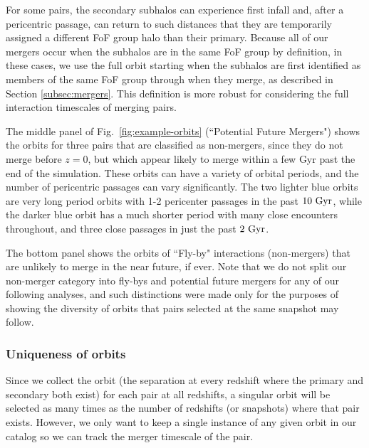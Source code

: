 \documentclass[twocolumn,linenumbers]{aastex631}
\begin{document}
For some pairs, the secondary subhalos can experience first infall and, after a pericentric passage, can return to such distances that they are temporarily assigned a different FoF group halo than their primary. 
Because all of our mergers occur when the subhalos are in the same FoF group by definition, in these cases, we use the full orbit starting when the subhalos are first identified as members of the same FoF group through when they merge, as described in Section \ref{subsec:mergers}.
This definition is more robust for considering the full interaction timescales of merging pairs.

The middle panel of Fig.~\ref{fig:example-orbits} (``Potential Future Mergers") shows the orbits for three pairs that are classified as non-mergers, since they do not merge before $z=0$, but which appear likely to merge within a few Gyr past the end of the simulation. 
These orbits can have a variety of orbital periods, and the number of pericentric passages can vary significantly. 
The two lighter blue orbits are very long period orbits with 1-2 pericenter passages in the past $10\,\mathrm{\,Gyr}$, while the darker blue orbit has a much shorter period with many close encounters throughout, and three close passages in just the past $2\,\mathrm{\,Gyr}$.

The bottom panel shows the orbits of ``Fly-by" interactions (non-mergers) that are unlikely to merge in the near future, if ever.  
Note that we do not split our non-merger category into fly-bys and potential future mergers for any of our following analyses, and such distinctions were made only for the purposes of showing the diversity of orbits that pairs selected at the same snapshot may follow.


\subsubsection{Uniqueness of orbits}
\label{sec:methods-unique}
Since we collect the orbit (the separation at every redshift where the primary and secondary both exist) for each pair at all redshifts, a singular orbit will be selected as many times as the number of redshifts (or snapshots) where that pair exists. However, we only want to keep a single instance of any given orbit in our catalog so we can track the merger timescale of the pair.
\end{document}
